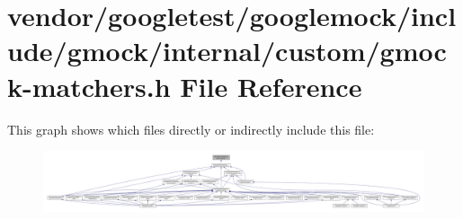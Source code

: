 \hypertarget{internal_2custom_2gmock-matchers_8h}{}\section{vendor/googletest/googlemock/include/gmock/internal/custom/gmock-\/matchers.h File Reference}
\label{internal_2custom_2gmock-matchers_8h}
This graph shows which files directly or indirectly include this file\+:\nopagebreak
\begin{figure}[H]
\begin{center}
\leavevmode
\includegraphics[width=350pt]{internal_2custom_2gmock-matchers_8h__dep__incl}
\end{center}
\end{figure}
